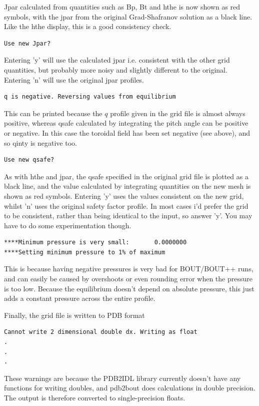 \documentclass[12pt]{article}
\begin{document}
Jpar calculated from quantities such as Bp, Bt and hthe is now shown as red
symbols, with the jpar from the original Grad-Shafranov solution as a black
line. Like the hthe display, this is a good consistency check.
\begin{verbatim}
Use new Jpar?
\end{verbatim}
Entering 'y' will use the calculated jpar i.e. consistent with the other grid quantities, but probably more noisy and slightly different to the original. Entering 'n' will use the original jpar profiles.

\begin{verbatim}
q is negative. Reversing values from equilibrium
\end{verbatim}
This can be printed because the $q$ profile given in the grid file is almost always positive, whereas qsafe calculated by integrating the pitch angle can be positive or negative. In this case the toroidal field has been set negative (see above), and so qinty is negative too.

\begin{verbatim}
Use new qsafe?
\end{verbatim}
As with hthe and jpar, the qsafe specified in the original grid file is plotted as a black line, and the value calculated by integrating quantities on the new mesh is shown as red symbols. Entering 'y' uses the values consistent on the new grid, whilst 'n' uses the original safety factor profile. In most cases i'd prefer the grid to be consistent, rather than being identical to the input, so answer 'y'. You may have to do some experimentation though.

\begin{verbatim}
****Minimum pressure is very small:       0.0000000
****Setting minimum pressure to 1% of maximum
\end{verbatim}
This is because having negative pressures is very bad for BOUT/BOUT++ runs, and can easily be caused by overshoots or even rounding error when the pressure is too low. Because the equilibrium doesn't depend on absolute pressure, this just adds a constant pressure across the entire profile.

Finally, the grid file is written to PDB format
\begin{verbatim}
Cannot write 2 dimensional double dx. Writing as float
.
.
.
\end{verbatim}
These warnings are because the PDB2IDL library currently doesn't have any functions for writing doubles, and pdb2bout does calculations in double precision. The output is therefore converted to single-precision floats.
\end{document}
